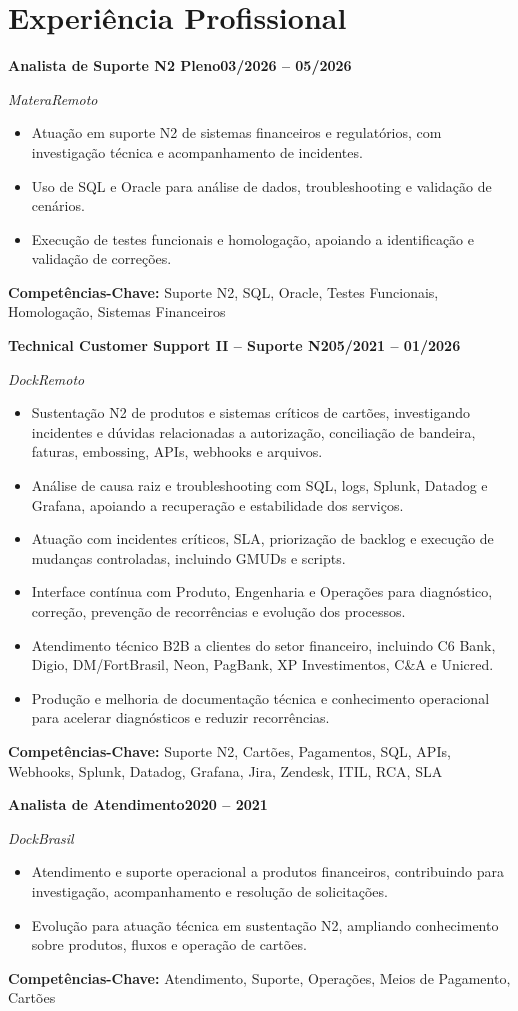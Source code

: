 \documentclass[a4paper,11pt]{article}
\newlength{\cventrysep}\setlength{\cventrysep}{6pt}
\newcommand{\cvsection}[1]{\section{#1}}
\newcommand{\cventry}[4]{%
  \Needspace{7\baselineskip}
  \noindent\normalsize\textbf{#1}\hfill\small\textbf{#4}\par
  \nopagebreak[4]
  \noindent\normalsize\textit{\textcolor{accent}{#2}}\hfill\small\textit{#3}\par
  \nopagebreak[4]
}
\newcommand{\keytech}[1]{\small\textbf{Competências-Chave:} #1\par}
\begin{document}
\cvsection{Experiência Profissional}

\cventry{Analista de Suporte N2 Pleno}{Matera}{Remoto}{03/2026 -- 05/2026}
\begin{itemize}\small
  \item Atuação em suporte N2 de sistemas financeiros e regulatórios, com investigação técnica e acompanhamento de incidentes.
  \item Uso de SQL e Oracle para análise de dados, troubleshooting e validação de cenários.
  \item Execução de testes funcionais e homologação, apoiando a identificação e validação de correções.
\end{itemize}
\keytech{Suporte N2, SQL, Oracle, Testes Funcionais, Homologação, Sistemas Financeiros}

\vspace{\cventrysep}

\cventry{Technical Customer Support II -- Suporte N2}{Dock}{Remoto}{05/2021 -- 01/2026}
\begin{itemize}\small
  \item Sustentação N2 de produtos e sistemas críticos de cartões, investigando incidentes e dúvidas relacionadas a autorização, conciliação de bandeira, faturas, embossing, APIs, webhooks e arquivos.
  \item Análise de causa raiz e troubleshooting com SQL, logs, Splunk, Datadog e Grafana, apoiando a recuperação e estabilidade dos serviços.
  \item Atuação com incidentes críticos, SLA, priorização de backlog e execução de mudanças controladas, incluindo GMUDs e scripts.
  \item Interface contínua com Produto, Engenharia e Operações para diagnóstico, correção, prevenção de recorrências e evolução dos processos.
  \item Atendimento técnico B2B a clientes do setor financeiro, incluindo C6 Bank, Digio, DM/FortBrasil, Neon, PagBank, XP Investimentos, C\&A e Unicred.
  \item Produção e melhoria de documentação técnica e conhecimento operacional para acelerar diagnósticos e reduzir recorrências.
\end{itemize}
\keytech{Suporte N2, Cartões, Pagamentos, SQL, APIs, Webhooks, Splunk, Datadog, Grafana, Jira, Zendesk, ITIL, RCA, SLA}

\vspace{\cventrysep}

\cventry{Analista de Atendimento}{Dock}{Brasil}{2020 -- 2021}
\begin{itemize}\small
  \item Atendimento e suporte operacional a produtos financeiros, contribuindo para investigação, acompanhamento e resolução de solicitações.
  \item Evolução para atuação técnica em sustentação N2, ampliando conhecimento sobre produtos, fluxos e operação de cartões.
\end{itemize}
\keytech{Atendimento, Suporte, Operações, Meios de Pagamento, Cartões}
\end{document}
